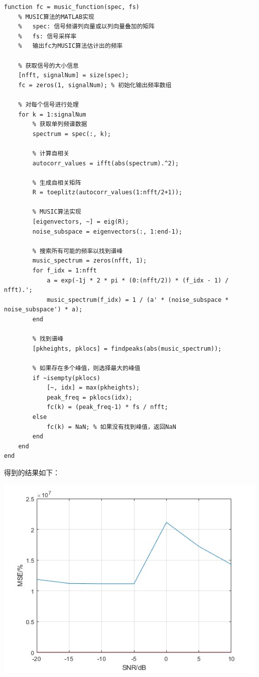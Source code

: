 \documentclass[a4paper,12pt]{article}
\begin{document}
\begin{lstlisting}
function fc = music_function(spec, fs)
    % MUSIC算法的MATLAB实现
    %   spec: 信号频谱列向量或以列向量叠加的矩阵
    %   fs: 信号采样率
    %   输出fc为MUSIC算法估计出的频率

    % 获取信号的大小信息
    [nfft, signalNum] = size(spec);
    fc = zeros(1, signalNum); % 初始化输出频率数组
    
    % 对每个信号进行处理
    for k = 1:signalNum
        % 获取单列频谱数据
        spectrum = spec(:, k);
        
        % 计算自相关
        autocorr_values = ifft(abs(spectrum).^2);
        
        % 生成自相关矩阵
        R = toeplitz(autocorr_values(1:nfft/2+1));
        
        % MUSIC算法实现
        [eigenvectors, ~] = eig(R);
        noise_subspace = eigenvectors(:, 1:end-1);
        
        % 搜索所有可能的频率以找到谱峰
        music_spectrum = zeros(nfft, 1);
        for f_idx = 1:nfft
            a = exp(-1j * 2 * pi * (0:(nfft/2)) * (f_idx - 1) / nfft).';
            music_spectrum(f_idx) = 1 / (a' * (noise_subspace * noise_subspace') * a);
        end
        
        % 找到谱峰
        [pkheights, pklocs] = findpeaks(abs(music_spectrum));
        
        % 如果存在多个峰值，则选择最大的峰值
        if ~isempty(pklocs)
            [~, idx] = max(pkheights);
            peak_freq = pklocs(idx);
            fc(k) = (peak_freq-1) * fs / nfft;
        else
            fc(k) = NaN; % 如果没有找到峰值，返回NaN
        end
    end
end

\end{lstlisting}

得到的结果如下：

\centering 
\includegraphics[width=0.8\linewidth]{images/2_Application/music.jpg}
\justifying
\end{document}
